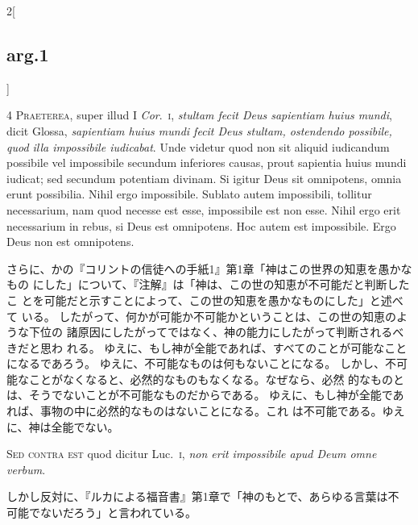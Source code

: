 \documentclass[paper=a4paper,fontsize=10pt,jafontsize=9pt,titlepage]{jlreq}
\begin{document}
\begin{paracol}{2}[\subsection{arg.1}]

{\scshape 4 Praeterea}, super illud I {\itshape Cor}.~{\scshape i}, {\itshape stultam
fecit Deus sapientiam huius mundi}, dicit Glossa, {\itshape sapientiam huius mundi
fecit Deus stultam, ostendendo possibile, quod illa impossibile
iudicabat}. Unde videtur quod non sit aliquid iudicandum possibile vel
impossibile secundum inferiores causas, prout sapientia huius mundi
iudicat; sed secundum potentiam divinam. Si igitur Deus sit omnipotens,
omnia erunt possibilia. Nihil ergo impossibile. Sublato autem
impossibili, tollitur necessarium, nam quod necesse est esse,
impossibile est non esse. Nihil ergo erit necessarium in rebus, si Deus
est omnipotens. Hoc autem est impossibile. Ergo Deus non est omnipotens.

\switchcolumn

さらに、かの『コリントの信徒への手紙1』第1章「神はこの世界の知恵を愚かなもの
 にした」について、『注解』は「神は、この世の知恵が不可能だと判断したこ
 とを可能だと示すことによって、この世の知恵を愚かなものにした」と述べて
 いる。
したがって、何かが可能か不可能かということは、この世の知恵のような下位の
 諸原因にしたがってではなく、神の能力にしたがって判断されるべきだと思わ
 れる。
ゆえに、もし神が全能であれば、すべてのことが可能なことになるであろう。
ゆえに、不可能なものは何もないことになる。
しかし、不可能なことがなくなると、必然的なものもなくなる。なぜなら、必然
 的なものとは、そうでないことが不可能なものだからである。
ゆえに、もし神が全能であれば、事物の中に必然的なものはないことになる。これ
 は不可能である。ゆえに、神は全能でない。

\switchcolumn*[\subsection{s.c.}]

{\scshape Sed contra est} quod dicitur Luc.~{\scshape i}, {\itshape non erit
impossibile apud Deum omne verbum}.

\switchcolumn

しかし反対に、『ルカによる福音書』第1章で「神のもとで、あらゆる言葉は不
 可能でないだろう」と言われている。



\end{paracol}
\end{document}
